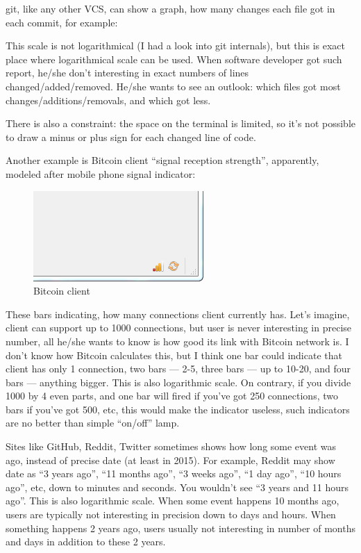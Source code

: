 
git, like any other VCS, can show a graph, how many changes each file got in each commit, for example:



This scale is not logarithmical (I had a look into git internals), but this is exact place where logarithmical scale can be used.
When software developer got such report, he/she don't interesting in exact numbers of lines changed/added/removed.
He/she wants to see an outlook: which files got most changes/additions/removals, and which got less.

There is also a constraint: the space on the terminal is limited, so it's not possible to draw a minus or plus sign for each changed line of code.

Another example is Bitcoin client ``signal reception strength'', apparently, modeled after mobile phone signal indicator:

\begin{figure}[H]
\centering
\includegraphics[scale=1]{log/bitcoin_bars.png}
\caption{Bitcoin client}
\end{figure}

These bars indicating, how many connections client currently has.
Let's imagine, client can support up to 1000 connections, but user is never interesting in precise number, all he/she wants to know is how good its link
with Bitcoin network is.
I don't know how Bitcoin calculates this, but I think one bar could indicate that client has only 1 connection, two bars --- 2-5, three bars --- up to 10-20,
and four bars --- anything bigger.
This is also logarithmic scale.
On contrary, if you divide 1000 by 4 even parts, and one bar will fired if you've got 250 connections, two bars if you've got 500, etc, 
this would make the indicator useless, such indicators are no better than simple ``on/off'' lamp.


Sites like GitHub, Reddit, Twitter sometimes shows how long some event was ago, instead of precise date (at least in 2015).
For example, Reddit may show date as ``3 years ago'', ``11 months ago'', ``3 weeks ago'', ``1 day ago'', ``10 hours ago'', etc, down to minutes and seconds.
You wouldn't see ``3 years and 11 hours ago''.
This is also logarithmic scale.
When some event happens 10 months ago, users are typically not interesting in precision down to days and hours.
When something happens 2 years ago, users usually not interesting in number of months and days in addition to these 2 years.

\levelup{}

